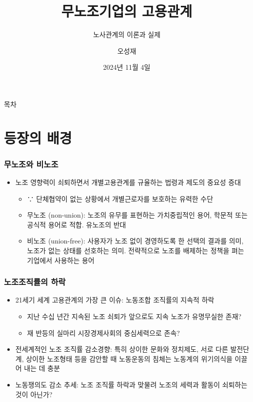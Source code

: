 \documentclass[aspectratio=169,xcolor=dvipsnames,handout]{beamer}
\title{무노조기업의 고용관계}
\subtitle{노사관계의 이론과 실제}
\author{오성재}
\institute[CNU]
{\relax
    충남대학교 경제학과\
    }
\date{2024년 11월 4일}
\begin{document}
\frame{\titlepage}

\begin{frame}{목차}
    \small
    \tableofcontents[hideallsubsections]
\end{frame}

\section{등장의 배경}
\begin{frame}
    \frametitle{무노조와 비노조}
    \begin{itemize}[<+->]
        \item 노조 영향력이 쇠퇴하면서 개별고용관계를 규율하는 법령과 제도의 중요성 증대
        \begin{itemize}
            \item ∵ 단체협약이 없는 상황에서 개별근로자를 보호하는 유력한 수단
        \end{itemize}
        \begin{itemize}
            \item 무노조 (non-union): 노조의 유무를 표현하는 가치중립적인 용어, 학문적 또는 공식적 용어로 적합. 유노조의 반대
            \item 비노조 (union-free): 사용자가 노조 없이 경영하도록 한 선택의 결과를 의미, 노조가 없는 상태를 선호하는 의미. 전략적으로 노조를 배제하는 정책을 펴는 기업에서 사용하는 용어
        \end{itemize}
    \end{itemize}
\end{frame}

\begin{frame}
    \frametitle{노조조직률의 하락}
    \begin{itemize}[<+->]
        \item 21세기 세계 고용관계의 가장 큰 이슈: 노동조합 조직률의 지속적 하락
        \begin{itemize}
            \item 지난 수십 년간 지속된 노조 쇠퇴가 앞으로도 지속   노조가 유명무실한 존재?
            \item 재 반등의 실마리  시장경제사회의 중심세력으로 존속? 
        \end{itemize}
        \item 전세계적인 노조 조직률 감소경향: 특히 상이한 문화와 정치제도, 서로 다른 발전단계, 상이한 노조형태 등을 감안할 때 노동운동의 침체는 노동계의 위기의식을 이끌어 내는 데 충분
        \item 노동쟁의도 감소 추세: 노조 조직률 하락과 맞물려 노조의 세력과 활동이 쇠퇴하는 것이 아닌가?
    \end{itemize}
\end{frame}
\end{document}
